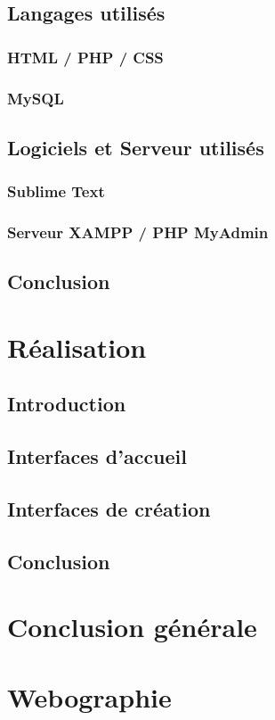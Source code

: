 \documentclass[12pt,a4paper]{report}
\begin{document}
\section{Langages utilisés}
\subsection{HTML / PHP / CSS}
\subsection{MySQL}
\section{Logiciels et Serveur utilisés}
\subsection{Sublime Text}
\subsection{Serveur XAMPP / PHP MyAdmin}
\section*{Conclusion}

\chapter{Réalisation}
\section*{Introduction}
\section{Interfaces d’accueil}
\section{Interfaces de création}
\section*{Conclusion}

\chapter*{Conclusion générale}

\chapter*{Webographie}
\end{document}
